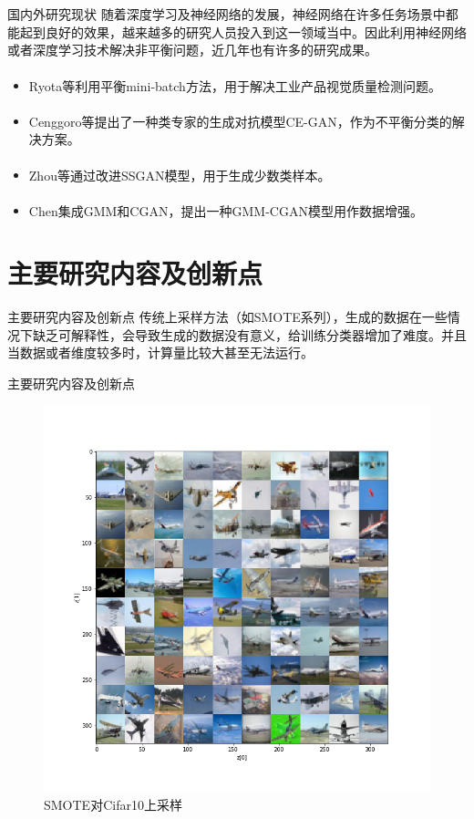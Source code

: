 \documentclass{beamer}
\newcommand{\upcite}[1]{\textsuperscript{\textsuperscript{\cite{#1}}}} %
\begin{document}
\begin{frame}{国内外研究现状}\pause
    随着深度学习及神经网络的发展，神经网络在许多任务场景中都能起到良好的效果，越来越多的研究人员投入到这一领域当中。因此利用神经网络或者深度学习技术解决非平衡问题，近几年也有许多的研究成果。
    \begin{itemize}
        \item 
        Ryota等\upcite{shimizu2018balanced}利用平衡mini-batch方法，用于解决工业产品视觉质量检测问题。
        \item 
        Cenggoro等\upcite{cenggoro2018deep}提出了一种类专家的生成对抗模型CE-GAN，作为不平衡分类的解决方案。
        \item  
        Zhou等\upcite{zhou2018gan}通过改进SSGAN模型，用于生成少数类样本。
        \item 
        Chen\upcite{Chen2018CGAN}集成GMM和CGAN，提出一种GMM-CGAN模型用作数据增强。
    \end{itemize}
    
    
\end{frame}



\section{主要研究内容及创新点}
\begin{frame}{主要研究内容及创新点}\pause
    传统上采样方法（如SMOTE系列），生成的数据在一些情况下缺乏可解释性，会导致生成的数据没有意义，给训练分类器增加了难度。并且当数据或者维度较多时，计算量比较大甚至无法运行。
\end{frame}

\begin{frame}{主要研究内容及创新点}\pause
    
    \begin{figure}[t]
        \includegraphics[scale=0.25]{zeros9.png}
        \caption{ SMOTE对Cifar10上采样}
    \end{figure}
\end{frame}
\end{document}
